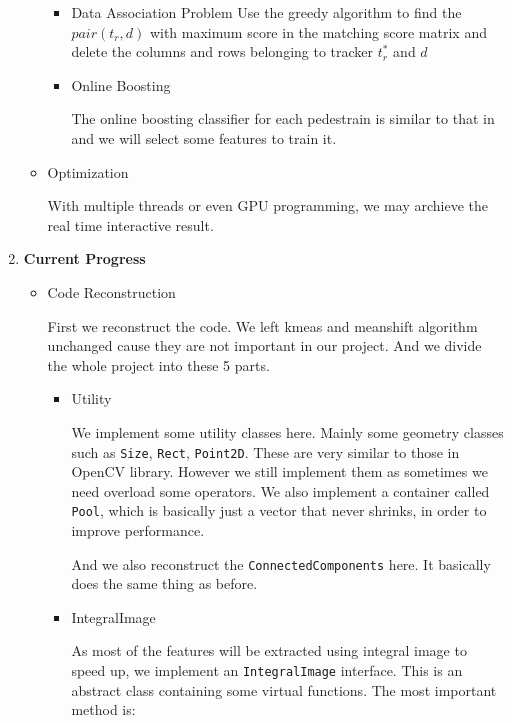 \documentclass[a4paper]{article}
\begin{document}
\begin{enumerate}
\begin{itemize}
\begin{itemize}

\item Data Association Problem
Use the greedy algorithm to find the $pair(t_r,d)$ with maximum score in the matching score matrix and delete the columns and rows belonging to tracker $t_r^*$ and $d$ 

\item Online Boosting

The online boosting classifier for each pedestrain is similar to that in \cite{Grabner:2006:OBV:1153170.1153451} and we will select some features to train it.

\end{itemize}

\item Optimization

With multiple threads or even GPU programming, we may archieve the real time interactive result.

\end{itemize}

\item \textbf{Current Progress}

\begin{itemize}

\item Code Reconstruction

First we reconstruct the code. We left kmeas and meanshift algorithm unchanged cause they are not important in our project. And we divide the whole project into these 5 parts.

\begin{itemize}

\item Utility

We implement some utility classes here. Mainly some geometry classes such as \lstinline{Size}, \lstinline{Rect}, \lstinline{Point2D}. These are very similar to those in OpenCV library. However we still implement them as sometimes we need overload some operators. We also implement a container called \lstinline{Pool}, which is basically just a vector that never shrinks, in order to improve performance.

And we also reconstruct the \lstinline{ConnectedComponents} here. It basically does the same thing as before.

\item IntegralImage

As most of the features will be extracted using integral image to speed up, we implement an \lstinline{IntegralImage} interface. This is an abstract class containing some virtual functions. The most important method is:


\end{itemize}
\end{itemize}
\end{enumerate}
\end{document}
